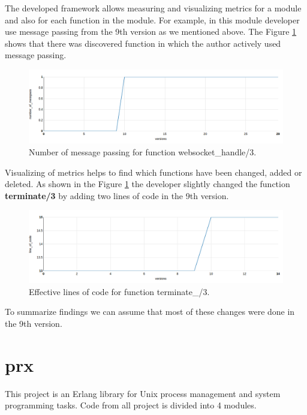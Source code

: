 The developed framework allows measuring and visualizing metrics for a module and also for each function in the module. For example, in this module developer use message passing from the 9th version as we mentioned above. The Figure \ref{fig:chat3} shows that there was discovered function in which the author actively used message passing.

\begin{figure}[ht]
	\centering
	\includegraphics[width=\textwidth]{figures/chat3.png}
	\caption{Number of message passing for function websocket\_handle/3.}
	\label{fig:chat3}
\end{figure}

Visualizing of metrics helps to find which functions have been changed, added or deleted. As shown in the Figure \ref{fig:chat3} the developer slightly changed the function \textbf{terminate/3} by adding two lines of code in the 9th version.

\begin{figure}[ht]
	\centering
	\includegraphics[width=\textwidth]{figures/chat4.png}
	\caption{
		Effective lines of code for function terminate\_/3.}
	\label{fig:chat4}
\end{figure}
 
To summarize findings we can assume that most of these changes were done in the 9th version.


\section{prx}

This project is an Erlang library for Unix process management and system programming tasks. Code from all project is divided into 4 modules. 

